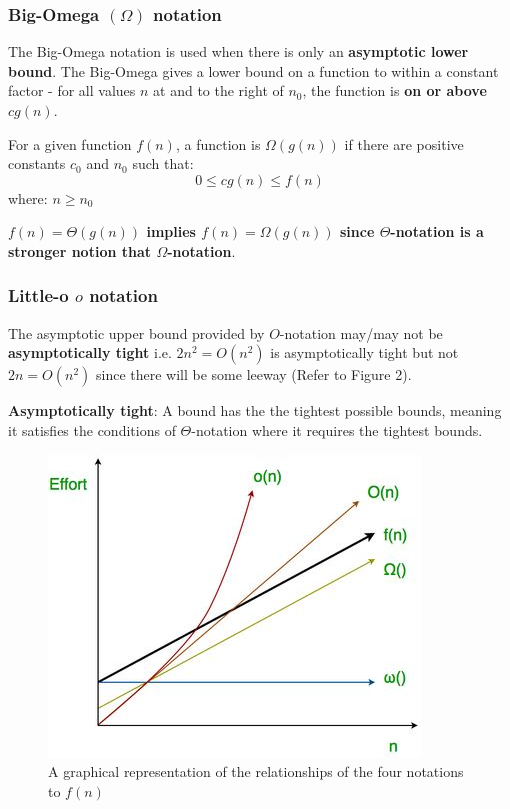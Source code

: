 \documentclass[10pt,a4paper]{article}
\begin{document}
\pagebreak

\subsubsection{Big-Omega $(\Omega)$ notation}

The Big-Omega notation is used when there is only an \textbf{asymptotic lower bound}. The Big-Omega gives a
lower bound on a function to within a constant factor - for all values $n$ at and to the right of
$n_0$, the function is \textbf{on or above} $cg(n)$.

\begin{tcolorbox}[breakable,colback=white]
    For a given function $f(n)$, a function is $\Omega(g(n))$ if there are positive constants $c_0$ and $n_0$ such that:
    $$
    0 \leq cg(n) \leq f(n) 
    $$
    where: $n\geq n_0$
\end{tcolorbox}

\textbf{$f(n)=\Theta(g(n))$ implies $f(n)=\Omega(g(n))$ since $\Theta$-notation is a stronger notion that $\Omega$-notation}.

\subsubsection{Little-o $o$ notation}

The asymptotic upper bound provided by $O$-notation may/may not be \textbf{asymptotically tight}
i.e. $2n^2 = O(n^2)$ is asymptotically tight but not $2n = O(n^2)$ since there will be some leeway
(Refer to Figure 2).

\begin{tcolorbox}[breakable,colback=white]
\textbf{Asymptotically tight}: A bound has the the tightest possible bounds, meaning it satisfies
the conditions of $\Theta$-notation where it requires the tightest bounds.
\end{tcolorbox}

\begin{figure} [h!]
    \centering
    \includegraphics[scale=0.7]{Asymptotically tight.JPG}
    \caption{A graphical representation of the relationships of the four notations to $f(n)$}
\end{figure}
\end{document}
